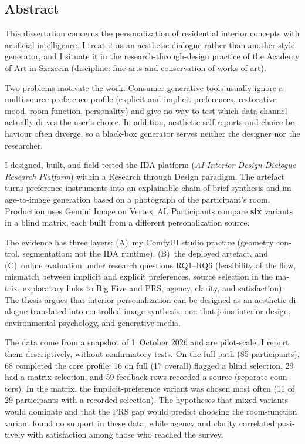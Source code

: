 \vspace{1.5em}
\begin{otherlanguage}{english}
\chapter*{Abstract}

This dissertation concerns the personalization of residential interior concepts with artificial intelligence. I treat it as an aesthetic dialogue rather than another style generator, and I situate it in the research-through-design practice of the Academy of Art in Szczecin (discipline: fine arts and conservation of works of art).

Two problems motivate the work. Consumer generative tools usually ignore a multi-source preference profile (explicit and implicit preferences, restorative mood, room function, personality) and give no way to test which data channel actually drives the user's choice. In addition, aesthetic self-reports and choice behaviour often diverge, so a black-box generator serves neither the designer nor the researcher.

I designed, built, and field-tested the IDA platform (\emph{AI Interior Design Dialogue Research Platform}) within a Research through Design paradigm. The artefact turns preference instruments into an explainable chain of brief synthesis and image-to-image generation based on a photograph of the participant's room. Production uses Gemini Image on Vertex~AI. Participants compare \textbf{six} variants in a blind matrix, each built from a different personalization source.

The evidence has three layers: (A)~my ComfyUI studio practice (geometry control, segmentation; not the IDA runtime), (B)~the deployed artefact, and (C)~online evaluation under research questions RQ1--RQ6 (feasibility of the flow, mismatch between implicit and explicit preferences, source selection in the matrix, exploratory links to Big Five and PRS, agency, clarity, and satisfaction). The thesis argues that interior personalization can be designed as an aesthetic dialogue translated into controlled image synthesis, one that joins interior design, environmental psychology, and generative media.

The data come from a snapshot of 1~October 2026 and are pilot-scale; I report them descriptively, without confirmatory tests. On the full path (85 participants), 68 completed the core profile; 16 on full (17 overall) flagged a blind selection, 29 had a matrix selection, and 59 feedback rows recorded a source (separate counters). In the matrix, the implicit-preference variant was chosen most often (11 of 29 participants with a recorded selection). The hypotheses that mixed variants would dominate and that the PRS gap would predict choosing the room-function variant found no support in these data, while agency and clarity correlated positively with satisfaction among those who reached the survey.
\end{otherlanguage}
